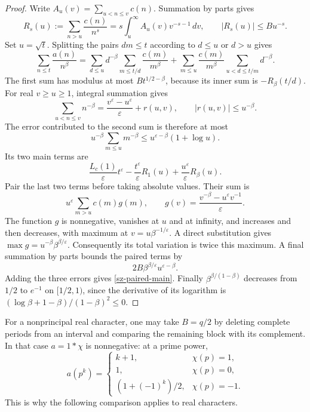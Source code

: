 \begin{proof}
Write $A_u(v)=\sum_{u<n\le v}c(n)$. Summation by parts gives
\[
 R_s(u):=\sum_{n>u}\frac{c(n)}{n^s}
      =s\int_u^\infty A_u(v)v^{-s-1}\,dv,
 \qquad |R_s(u)|\le Bu^{-s}.
\]
Set $u=\sqrt t$. Splitting the pairs $dm\le t$ according to $d\le u$
or $d>u$ gives
\[
 \sum_{n\le t}\frac{a(n)}{n^\beta}
 =\sum_{d\le u}d^{-\beta}\sum_{m\le t/d}\frac{c(m)}{m^\beta}
  +\sum_{m\le u}\frac{c(m)}{m^\beta}
            \sum_{u<d\le t/m}d^{-\beta}.
\]
The first sum has modulus at most $Bt^{1/2-\beta}$, because its inner
sum is $-R_\beta(t/d)$. For real $v\ge u\ge1$, integral summation gives
\[
 \sum_{u<n\le v}n^{-\beta}
 =\frac{v^\varepsilon-u^\varepsilon}{\varepsilon}+r(u,v),
 \qquad |r(u,v)|\le u^{-\beta}.
\]
The error contributed to the second sum is therefore at most
\[
 u^{-\beta}\sum_{m\le u}m^{-\beta}
 \le u^{\varepsilon-\beta}(1+\log u).
\]
Its two main terms are
\[
 \frac{L_c(1)}\varepsilon t^\varepsilon
 -\frac{t^\varepsilon}\varepsilon R_1(u)
 +\frac{u^\varepsilon}\varepsilon R_\beta(u).
\]
Pair the last two terms before taking absolute values. Their sum is
\[
 u^\varepsilon\sum_{m>u}c(m)g(m),\qquad
 g(v)=\frac{v^{-\beta}-u^\varepsilon v^{-1}}\varepsilon.
\]
The function $g$ is nonnegative, vanishes at $u$ and at infinity, and
increases and then decreases, with maximum at $v=u\beta^{-1/\varepsilon}$.
A direct substitution gives
$\max g=u^{-\beta}\beta^{\beta/\varepsilon}$.
Consequently its total variation is twice this maximum. A final summation
by parts bounds the paired terms by
\[
 2B\beta^{\beta/\varepsilon}u^{\varepsilon-\beta}.
\]
Adding the three errors gives \eqref{sz-paired-main}. Finally
$\beta^{\beta/(1-\beta)}$ decreases from $1/2$ to $e^{-1}$ on
$[1/2,1)$, since the derivative of its logarithm is
$(\log\beta+1-\beta)/(1-\beta)^2\le0$.
\end{proof}

For a nonprincipal real character, one may take $B=q/2$ by deleting complete
periods from an interval and comparing the remaining block with its
complement. In that case $a=1*\chi$ is nonnegative: at a prime power,
\[
 a(p^k)=
 \begin{cases}
 k+1,&\chi(p)=1,\\
 1,&\chi(p)=0,\\
 (1+(-1)^k)/2,&\chi(p)=-1.
 \end{cases}
\]
This is why the following comparison applies to real characters.

